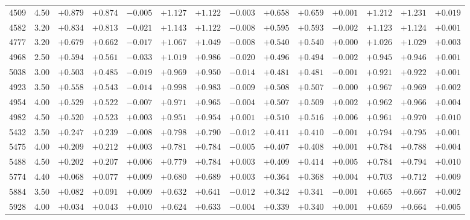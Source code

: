 \documentclass[]{aa}
\begin{document}
\begin{appendix}
\begin{table*}
\begin{center}
\begin{tabular}{llllllllllllll}
4509  &4.50 & $+0.879$ & $+0.874$ &$ -0.005$ &$ +1.127$ &$ +1.122$ &$ -0.003$ &$ +0.658$ &$ +0.659$ &$ +0.001$ &$ +1.212$&$ +1.231$&$  +0.019$ \\
4582  &3.20 & $+0.834$ & $+0.813$ &$ -0.021$ &$ +1.143$ &$ +1.122$ &$ -0.008$ &$ +0.595$ &$ +0.593$ &$ -0.002$ &$ +1.123$&$ +1.124$&$  +0.001$ \\
4777  &3.20 & $+0.679$ & $+0.662$ &$ -0.017$ &$ +1.067$ &$ +1.049$ &$ -0.008$ &$ +0.540$ &$ +0.540$ &$ +0.000$ &$ +1.026$&$ +1.029$&$  +0.003$ \\
4968  &2.50 & $+0.594$ & $+0.561$ &$ -0.033$ &$ +1.019$ &$ +0.986$ &$ -0.020$ &$ +0.496$ &$ +0.494$ &$ -0.002$ &$ +0.945$&$ +0.946$&$  +0.001$ \\
5038  &3.00 & $+0.503$ & $+0.485$ &$ -0.019$ &$ +0.969$ &$ +0.950$ &$ -0.014$ &$ +0.481$ &$ +0.481$ &$ -0.001$ &$ +0.921$&$ +0.922$&$  +0.001$ \\
4923  &3.50 & $+0.558$ & $+0.543$ &$ -0.014$ &$ +0.998$ &$ +0.983$ &$ -0.009$ &$ +0.508$ &$ +0.507$ &$ -0.000$ &$ +0.967$&$ +0.969$&$  +0.002$ \\
4954  &4.00 & $+0.529$ & $+0.522$ &$ -0.007$ &$ +0.971$ &$ +0.965$ &$ -0.004$ &$ +0.507$ &$ +0.509$ &$ +0.002$ &$ +0.962$&$ +0.966$&$  +0.004$ \\
4982  &4.50 & $+0.520$ & $+0.523$ &$ +0.003$ &$ +0.951$ &$ +0.954$ &$ +0.001$ &$ +0.510$ &$ +0.516$ &$ +0.006$ &$ +0.961$&$ +0.970$&$  +0.010$ \\
5432  &3.50 & $+0.247$ & $+0.239$ &$ -0.008$ &$ +0.798$ &$ +0.790$ &$ -0.012$ &$ +0.411$ &$ +0.410$ &$ -0.001$ &$ +0.794$&$ +0.795$&$  +0.001$ \\
5475  &4.00 & $+0.209$ & $+0.212$ &$ +0.003$ &$ +0.781$ &$ +0.784$ &$ -0.005$ &$ +0.407$ &$ +0.408$ &$ +0.001$ &$ +0.784$&$ +0.788$&$  +0.004$ \\
5488  &4.50 & $+0.202$ & $+0.207$ &$ +0.006$ &$ +0.779$ &$ +0.784$ &$ +0.003$ &$ +0.409$ &$ +0.414$ &$ +0.005$ &$ +0.784$&$ +0.794$&$  +0.010$ \\
5774  &4.40 & $+0.068$ & $+0.077$ &$ +0.009$ &$ +0.680$ &$ +0.689$ &$ +0.003$ &$ +0.364$ &$ +0.368$ &$ +0.004$ &$ +0.703$&$ +0.712$&$  +0.009$ \\
5884  &3.50 & $+0.082$ & $+0.091$ &$ +0.009$ &$ +0.632$ &$ +0.641$ &$ -0.012$ &$ +0.342$ &$ +0.341$ &$ -0.001$ &$ +0.665$&$ +0.667$&$  +0.002$ \\
5928  &4.00 & $+0.034$ & $+0.043$ &$ +0.010$ &$ +0.624$ &$ +0.633$ &$ -0.004$ &$ +0.339$ &$ +0.340$ &$ +0.001$ &$ +0.659$&$ +0.664$&$  +0.005$ \\

\end{tabular}
\end{center}
\end{table*}
\end{appendix}
\end{document}
